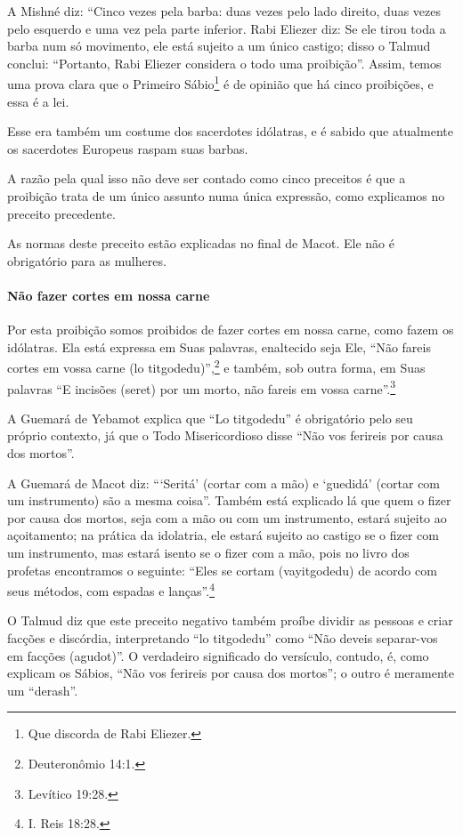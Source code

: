 A Mishné diz: ``Cinco vezes pela barba: duas vezes pelo lado direito,
duas vezes pelo esquerdo e uma vez pela parte inferior. Rabi Eliezer
diz: Se ele tirou toda a barba num só movimento, ele está sujeito a um
único castigo; disso o Talmud conclui: ``Portanto, Rabi Eliezer
considera o todo uma proibição''. Assim, temos uma prova clara que o
Primeiro Sábio\footnote{Que discorda de Rabi Eliezer.} é de opinião que há cinco
proibições, e essa é a lei.

Esse era também um costume dos sacerdotes idólatras, e é sabido que
atualmente os sacerdotes Europeus raspam suas barbas.

A razão pela qual isso não deve ser contado como cinco preceitos é que a
proibição trata de um único assunto numa única expressão, como
explicamos no preceito precedente.

As normas deste preceito estão explicadas no final de Macot. Ele não é
obrigatório para as mulheres.

\paragraph{Não fazer cortes em nossa carne}

Por esta proibição somos proibidos de fazer cortes em nossa carne, como
fazem os idólatras. Ela está expressa em Suas palavras, enaltecido seja
Ele, ``Não fareis cortes em vossa carne (lo titgodedu)'',\footnote{Deuteronômio
14:1.} e também, sob outra forma, em Suas palavras ``E incisões (seret)
por um morto, não fareis em vossa carne''.\footnote{Levítico 19:28.}

A Guemará de Yebamot explica que ``Lo titgodedu'' é obrigatório
pelo seu próprio contexto, já que o Todo Misericordioso disse ``Não vos
ferireis por causa dos mortos''.

A Guemará de Macot diz: ```Seritá' (cortar com a mão) e `guedidá'
(cortar com um instrumento) são a mesma coisa''. Também está explicado
lá que quem o fizer por causa dos mortos, seja com a mão ou com um
instrumento, estará sujeito ao açoitamento; na prática da idolatria,
ele estará sujeito ao castigo se o fizer com um instrumento, mas estará
isento se o fizer com a mão, pois no livro dos profetas encontramos o
seguinte: ``Eles se cortam (vayitgodedu) de acordo com seus métodos,
com espadas e lanças''.\footnote{I. Reis 18:28.}

O Talmud diz que este preceito negativo também proíbe dividir as pessoas
e criar facções e discórdia, interpretando ``lo titgodedu'' como ``Não
deveis separar-vos em facções (agudot)''. O verdadeiro significado do
versículo, contudo, é, como explicam os Sábios, ``Não vos ferireis por
causa dos mortos''; o outro é meramente um ``derash''.


